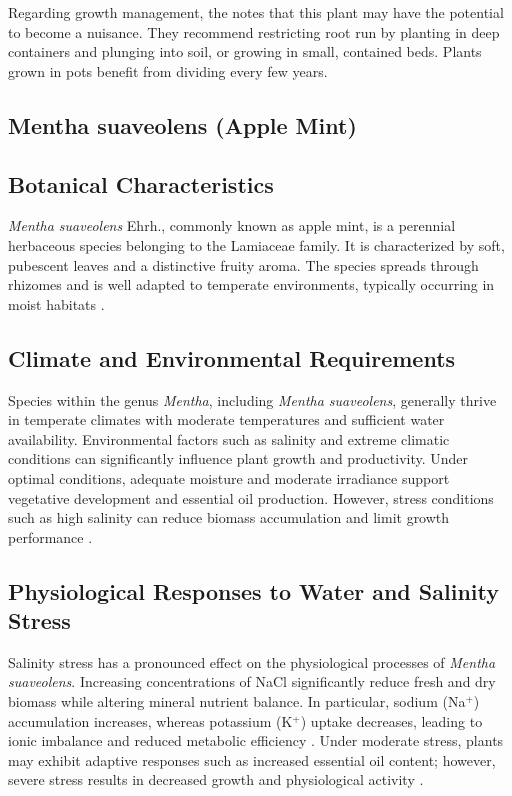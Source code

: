 Regarding growth management, the \textcite{rhs2026crispa} notes that this plant may have the potential to become a nuisance. They recommend restricting root run by planting in deep containers and plunging into soil, or growing in small, contained beds. Plants grown in pots benefit from dividing every few years.

\subsection{Mentha suaveolens (Apple Mint)}

\subsection*{Botanical Characteristics}
\textit{Mentha suaveolens} Ehrh., commonly known as apple mint, is a perennial herbaceous species belonging to the Lamiaceae family. It is characterized by soft, pubescent leaves and a distinctive fruity aroma. The species spreads through rhizomes and is well adapted to temperate environments, typically occurring in moist habitats \textcite{Magdy2025}.

\subsection*{Climate and Environmental Requirements}
Species within the genus \textit{Mentha}, including \textit{Mentha suaveolens}, generally thrive in temperate climates with moderate temperatures and sufficient water availability. Environmental factors such as salinity and extreme climatic conditions can significantly influence plant growth and productivity. Under optimal conditions, adequate moisture and moderate irradiance support vegetative development and essential oil production. However, stress conditions such as high salinity can reduce biomass accumulation and limit growth performance \textcite{Ahmadi2023, Magdy2025}.

\subsection*{Physiological Responses to Water and Salinity Stress}
Salinity stress has a pronounced effect on the physiological processes of \textit{Mentha suaveolens}. Increasing concentrations of NaCl significantly reduce fresh and dry biomass while altering mineral nutrient balance. In particular, sodium (Na$^+$) accumulation increases, whereas potassium (K$^+$) uptake decreases, leading to ionic imbalance and reduced metabolic efficiency \textcite{Kasrati2014}. Under moderate stress, plants may exhibit adaptive responses such as increased essential oil content; however, severe stress results in decreased growth and physiological activity \textcite{Ahmadi2023}.

